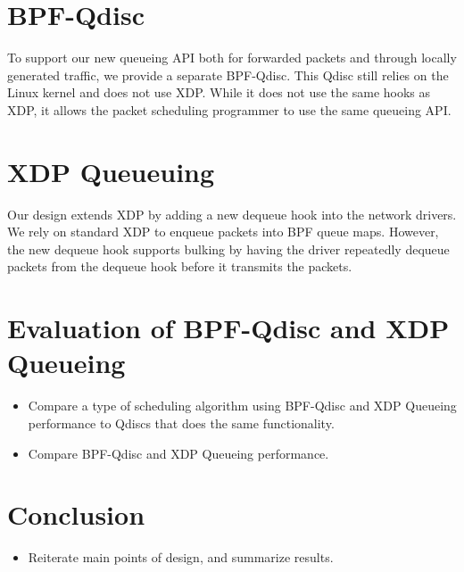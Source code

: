 \documentclass[sigconf, nonacm]{acmart}
\begin{document}
\section{BPF-Qdisc}


To support our new queueing API both for forwarded packets and through locally generated traffic, we provide a separate BPF-Qdisc. This Qdisc still relies on the Linux kernel and does not use XDP. While it does not use the same hooks as XDP, it allows the packet scheduling programmer to use the same queueing API.


\section{XDP Queueuing}


Our design extends XDP by adding a new dequeue hook into the network drivers. We rely on standard XDP to enqueue packets into BPF queue maps. However, the new dequeue hook supports bulking by having the driver repeatedly dequeue packets from the dequeue hook before it transmits the packets.


\section{Evaluation of BPF-Qdisc and XDP Queueing}

\begin{itemize}
  \item Compare a type of scheduling algorithm using BPF-Qdisc and XDP Queueing performance to Qdiscs that does the same functionality.
  \item Compare BPF-Qdisc and XDP Queueing performance.
\end{itemize}

\section{Conclusion}

\begin{itemize}
  \item Reiterate main points of design, and summarize results.
\end{itemize}





\end{document}
